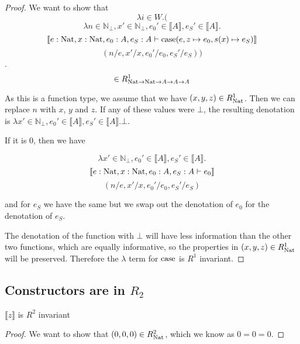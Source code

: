 \vspace{0.25cm}

\begin{proof}

 We want to show that 
 \[ \lambda i \in W. (\]
\[\lambda n \in \mathbb{N}_{\bot}, x' \in \mathbb{N}_{\bot}, e_0' \in \llbracket A \rrbracket ,  e_S' \in \llbracket A \rrbracket .\]
\[ \llbracket e : \operatorname{Nat}, x : \operatorname{Nat}, e_0 : A , e_S : A \vdash \operatorname{case} (e, z \mapsto e_0, s(x) \mapsto e_S) \rrbracket\]
\[ (n/e, x'/x, e_0'/e_0, e_S'/e_S))\].
\[ \in R_{\operatorname{Nat} \to \operatorname{Nat} \to A \to A \to A}^1\]

As this is a function type, we assume that we have $(x,y,z) \in R_{\operatorname{Nat}}^1$. Then we can replace $n$ with $x$, $y$ and $z$. If any of these values were $\bot$, the resulting denotation is $\lambda x' \in \mathbb{N}_{\bot}, e_0' \in \llbracket A \rrbracket ,  e_S' \in \llbracket A \rrbracket . \bot$.

If it is $0$, then we have 

\[ \lambda x' \in \mathbb{N}_{\bot}, e_0' \in \llbracket A \rrbracket ,  e_S' \in \llbracket A \rrbracket .\] \[\llbracket e : \operatorname{Nat}, x : \operatorname{Nat}, e_0 : A , e_S : A \vdash e_0 \rrbracket\]
\[ (n/e, x'/x, e_0'/e_0, e_S'/e_S)\]

and for $e_S$ we have the same but we swap out the denotation of $e_0$ for the denotation of $e_S$.

The denotation of the function with $\bot$ will have less information than the other two functions, which are equally informative, so the properties in $(x,y,z) \in R_{\operatorname{Nat}}^1$ will be preserved. Therefore the $\lambda$ term for $\operatorname{case}$ is $R^1$ invariant.
\end{proof}



\subsection{Constructors are in $R_2$}

\begin{lem}
$\llbracket z \rrbracket$ is $R^2$ invariant
\end{lem}

\vspace{0.25cm}

\begin{proof}
We want to show that $(0,0,0) \in R_{\operatorname{Nat}}^2$, which we know as $0=0=0$.
\end{proof}

\vspace{0.5cm}

